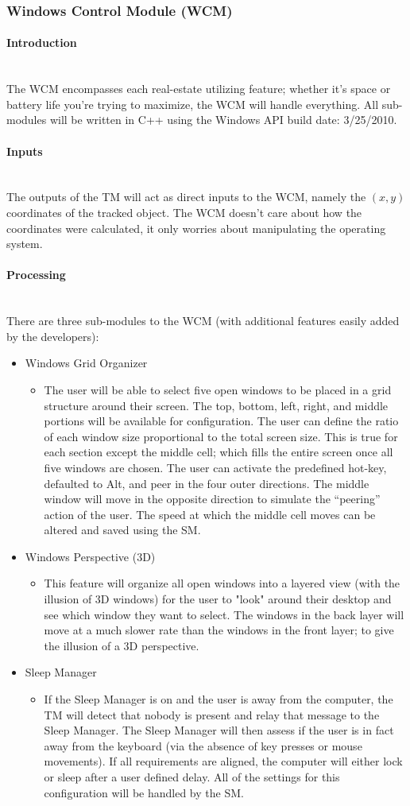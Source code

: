 \documentclass[titlepage]{article}
\newcommand{\myparagraph}[1]{\paragraph{#1}\mbox{}\\}
\begin{document}
\subsubsection{Windows Control Module (WCM)}

\myparagraph{Introduction}
The WCM encompasses each real-estate utilizing feature; whether it's space or battery life you're trying to maximize, the WCM will handle everything. All sub-modules will be written in C++ using the Windows API build date: 3/25/2010.

\myparagraph{Inputs}
The outputs of the TM will act as direct inputs to the WCM, namely the $(x,y)$ coordinates of the tracked object. The WCM doesn't care about how the coordinates were calculated, it only worries about manipulating the operating system.

\myparagraph{Processing}
There are three sub-modules to the WCM (with additional features easily added by the developers):
\begin{itemize}
	\item Windows Grid Organizer
	\begin{itemize}[label={}]
		\item The user will be able to select five open windows to be placed in a grid structure around their screen. The top, bottom, left, right, and middle portions will be available for configuration. The user can define the ratio of each window size proportional to the total screen size. This is true for each section except the middle cell; which fills the entire screen once all five windows are chosen. The user can activate the predefined hot-key, defaulted to Alt, and peer in the four outer directions. The middle window will move in the opposite direction to simulate the ``peering'' action of the user. The speed at which the middle cell moves can be altered and saved using the SM.
	\end{itemize}
	\item Windows Perspective (3D)
	\begin{itemize}[label={}]
		\item This feature will organize all open windows into a layered view (with the illusion of 3D windows) for the user to "look" around their desktop and see which window they want to select. The windows in the back layer will move at a much slower rate than the windows in the front layer; to give the illusion of a 3D perspective.
	\end{itemize}
	\item Sleep Manager
	\begin{itemize}[label={}]
		\item If the Sleep Manager is on and the user is away from the computer, the TM will detect that nobody is present and relay that message to the Sleep Manager. The Sleep Manager will then assess if the user is in fact away from the keyboard (via the absence of key presses or mouse movements). If all requirements are aligned, the computer will either lock or sleep after a user defined delay. All of the settings for this configuration will be handled by the SM.
	\end{itemize}
\end{itemize}
\end{document}
